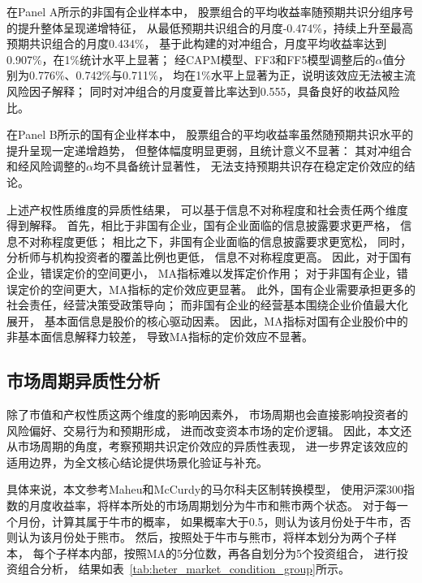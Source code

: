 在Panel A所示的非国有企业样本中，
股票组合的平均收益率随预期共识分组序号的提升整体呈现递增特征，
从最低预期共识组合的月度-0.474\%，持续上升至最高预期共识组合的月度0.434\%，
基于此构建的对冲组合，月度平均收益率达到0.907\%，在1\%统计水平上显著；
经CAPM模型、FF3和FF5模型调整后的$\alpha$值分别为0.776\%、0.742\%与0.711\%，
均在1\%水平上显著为正，说明该效应无法被主流风险因子解释；
同时对冲组合的月度夏普比率达到0.555，具备良好的收益风险比。

在Panel B所示的国有企业样本中，
股票组合的平均收益率虽然随预期共识水平的提升呈现一定递增趋势，
但整体幅度明显更弱，且统计意义不显著：
其对冲组合和经风险调整的$\alpha$均不具备统计显著性，
无法支持预期共识存在稳定定价效应的结论。

 \FloatBarrier

上述产权性质维度的异质性结果，
可以基于信息不对称程度和社会责任两个维度得到解释。
首先，相比于非国有企业，国有企业面临的信息披露要求更严格，
信息不对称程度更低；
相比之下，非国有企业面临的信息披露要求更宽松，
同时，分析师与机构投资者的覆盖比例也更低，
信息不对称程度更高。
因此，对于国有企业，错误定价的空间更小\cite{hong2007disagreement}\cite{boehme2006short}，
MA指标难以发挥定价作用；
对于非国有企业，错误定价的空间更大，MA指标的定价效应更显著。
此外，国有企业需要承担更多的社会责任，经营决策受政策导向\cite{魏志华2025国企估值}；
而非国有企业的经营基本围绕企业价值最大化展开，
基本面信息是股价的核心驱动因素。
因此，MA指标对国有企业股价中的非基本面信息解释力较差，
导致MA指标的定价效应不显著。

\subsection{市场周期异质性分析}
除了市值和产权性质这两个维度的影响因素外，
市场周期也会直接影响投资者的风险偏好、交易行为和预期形成，
进而改变资本市场的定价逻辑。
因此，本文还从市场周期的角度，考察预期共识定价效应的异质性表现，
进一步界定该效应的适用边界，为全文核心结论提供场景化验证与补充。

具体来说，本文参考Maheu和McCurdy的马尔科夫区制转换模型\cite{maheu2000identifying}，
使用沪深300指数的月度收益率，将样本所处的市场周期划分为牛市和熊市两个状态。
对于每一个月份，计算其属于牛市的概率，
如果概率大于0.5，则认为该月份处于牛市，否则认为该月份处于熊市。
然后，按照处于牛市与熊市，将样本划分为两个子样本，
每个子样本内部，按照MA的5分位数，再各自划分为5个投资组合，
进行投资组合分析，
结果如表~\ref{tab:heter_market_condition_group}所示。

